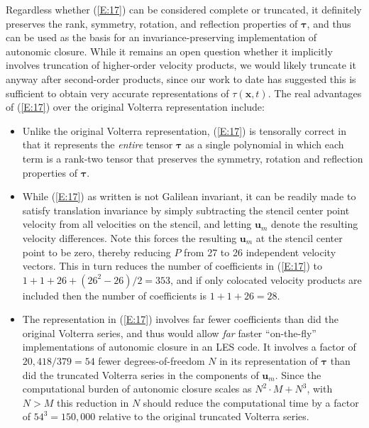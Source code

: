 Regardless whether (\ref{E:17}) can be considered complete or truncated, it definitely preserves the rank, symmetry, rotation, and reflection properties of $\mathbf{\tau}$, and thus can be used as the basis for an invariance-preserving implementation of autonomic closure. While it remains an open question whether it implicitly involves truncation of higher-order velocity products, we would likely truncate it anyway after second-order products, since our work to date has suggested this is sufficient to obtain very accurate representations of $\tau(\mathbf{x},t)$. The real advantages of (\ref{E:17}) over the original Volterra representation include:

\begin{itemize}
	\item 	Unlike the original Volterra representation, (\ref{E:17}) is tensorally correct in that it represents the \textit{entire} tensor  $\mathbf{\tau}$ as a single polynomial in which each term is a rank-two tensor that preserves the symmetry, rotation and reflection properties of $\mathbf{\tau}$.

	\item	While (\ref{E:17}) as written is not Galilean invariant, it can be readily made to satisfy translation invariance by simply subtracting the stencil center point velocity from all velocities on the stencil, and letting  $\mathbf{u}_{m}$ denote the resulting velocity differences.  Note this forces the resulting $\mathbf{u}_{m}$ at the stencil center point to be zero, thereby reducing $P$ from 27 to 26 independent velocity vectors.  This in turn reduces the number of coefficients in (\ref{E:17}) to $1 + 1 + 26 + (26^2 - 26)/2 = 353$, and if only colocated velocity products are included then the number of coefficients is $1 + 1 + 26 = 28$.

	\item	The representation in (\ref{E:17}) involves far fewer coefficients than did the original Volterra series, and thus would allow \textit{far} faster ``on-the-fly'' implementations of autonomic closure in an LES code. It involves a factor of $20,418/379 = 54$  fewer degrees-of-freedom $N$ in its representation of $\mathbf{\tau}$  than did the truncated Volterra series in the components of $\mathbf{u}_{m}$. Since the computational burden of autonomic closure scales as $N^2 \cdot M + N^3$, with $N > M$  this reduction in $N$ should reduce the computational time by a factor of $54^3 = 150,000$  relative to the original truncated Volterra series.


\end{itemize}
